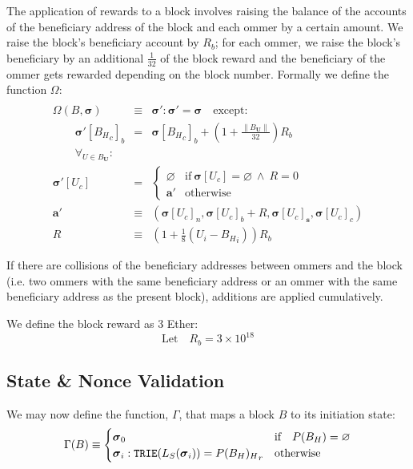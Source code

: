 \documentclass[9pt,oneside]{amsart}
\begin{document}
\begin{multicols}{2}
The application of rewards to a block involves raising the balance of the accounts of the beneficiary address of the block and each ommer by a certain amount. We raise the block's beneficiary account by $R_b$; for each ommer, we raise the block's beneficiary by an additional $\frac{1}{32}$ of the block reward and the beneficiary of the ommer gets rewarded depending on the block number. Formally we define the function $\Omega$:
\begin{eqnarray}
\\ \nonumber
\Omega(B, \boldsymbol{\sigma}) & \equiv & \boldsymbol{\sigma}': \boldsymbol{\sigma}' = \boldsymbol{\sigma} \quad \text{except:} \\
\qquad\boldsymbol{\sigma}'[{B_H}_c]_b & = & \boldsymbol{\sigma}[{B_H}_c]_b + (1 + \frac{\lVert B_\mathbf{U}\rVert}{32})R_b \\
\qquad\forall_{U \in B_\mathbf{U}}: \\ \nonumber
\boldsymbol{\sigma}'[U_c] & = & \begin{cases}
\varnothing &\text{if}\ \boldsymbol{\sigma}[U_c] = \varnothing\ \wedge\ R = 0 \\
\mathbf{a}' &\text{otherwise}
\end{cases} \\
\mathbf{a}' &\equiv& (\boldsymbol{\sigma}[U_c]_n, \boldsymbol{\sigma}[U_c]_b + R, \boldsymbol{\sigma}[U_c]_\mathbf{s}, \boldsymbol{\sigma}[U_c]_c) \\
R & \equiv & (1 + \frac{1}{8} (U_i - {B_H}_i)) R_b
\end{eqnarray}

If there are collisions of the beneficiary addresses between ommers and the block (i.e. two ommers with the same beneficiary address or an ommer with the same beneficiary address as the present block), additions are applied cumulatively.

We define the block reward as 3 Ether:
\begin{equation}
\text{Let} \quad R_b = 3 \times 10^{18}
\end{equation}

\subsection{State \& Nonce Validation}\label{sec:statenoncevalidation}

We may now define the function, $\Gamma$, that maps a block $B$ to its initiation state:
\begin{equation}
\Gamma(B) \equiv \begin{cases}
\boldsymbol{\sigma}_0 & \text{if} \quad P(B_H) = \varnothing \\
\boldsymbol{\sigma}_i: \mathtt{\small TRIE}(L_S(\boldsymbol{\sigma}_i)) = {P(B_H)_H}_r & \text{otherwise}
\end{cases}
\end{equation}


\end{multicols}
\end{document}

